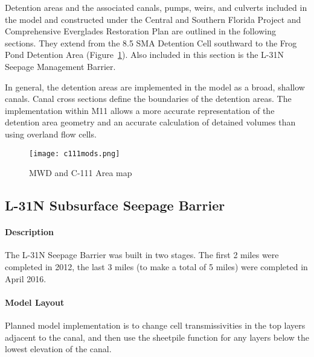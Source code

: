 \clearpage

Detention areas and the associated canals, pumps, weirs, and culverts included in the model and constructed under the Central and Southern Florida Project and Comprehensive Everglades Restoration Plan are outlined in the following sections. They extend from the 8.5 SMA Detention Cell southward to the Frog Pond Detention Area (Figure~\ref{fig:c111mods}). Also included in this section is the L-31N Seepage Management Barrier.

In general, the detention areas are implemented in the model as a broad, shallow canals.  Canal cross sections define the boundaries of the detention areas. The implementation within M11 allows a more accurate representation of the detention area geometry and an accurate calculation of detained volumes than using overland flow cells.

\begin{figure}[!h]
  \begin{center}
  \texttt{[image: c111mods.png]}
  \caption{MWD and C-111 Area map}
  \label{fig:c111mods}
  \end{center}
\end{figure}


\clearpage
\subsection{L-31N Subsurface Seepage Barrier}
\paragraph{Description}
The L-31N Seepage Barrier was built in two stages. The first 2 miles were completed in 2012, the last 3 miles (to make a total of 5 miles) were completed in April 2016.

\paragraph{Model Layout}

\begin{notes}
Planned model implementation is to change cell transmissivities in the top layers adjacent to the canal, and then use the sheetpile function for any layers below the lowest elevation of the canal.
\end{notes}

